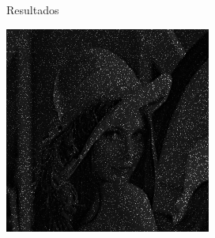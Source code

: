 \documentclass{beamer}
\begin{document}
\begin{frame}[fragile]{Resultados}
\begin{minipage}{0.45\linewidth}
		\includegraphics[width=\linewidth]{../results/lena_ej8b}
		\label{fig:lenaej8b}
	\end{minipage}
\end{frame}
\end{document}
